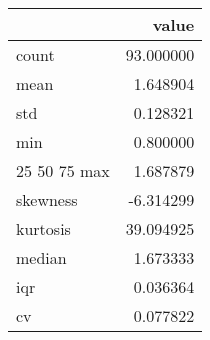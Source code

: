\begin{tabular}{lr}
\toprule
 & value \\
\midrule
count & 93.000000 \\
mean & 1.648904 \\
std & 0.128321 \\
min & 0.800000 \\
25%
50%
75%
max & 1.687879 \\
skewness & -6.314299 \\
kurtosis & 39.094925 \\
median & 1.673333 \\
iqr & 0.036364 \\
cv & 0.077822 \\
\bottomrule
\end{tabular}
